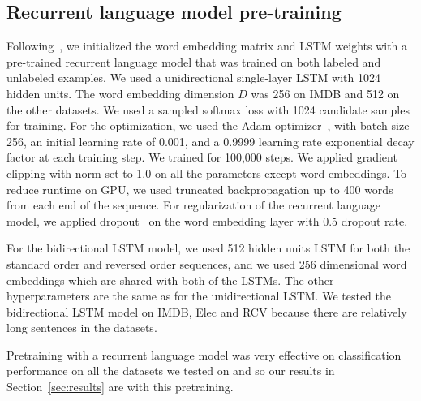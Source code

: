 \documentclass{article}
\begin{document}
\subsection{Recurrent language model pre-training}
Following~\citet{dai2015semi}, we initialized the word embedding 
matrix and LSTM weights with a pre-trained recurrent language model
\cite[]{bengio2006neural, mikolov2010recurrent} that was trained on both labeled and unlabeled
examples.
We used a unidirectional single-layer LSTM with 1024 hidden units.
The word embedding dimension $D$ was 256 on IMDB and 512 on the other datasets. 
We used a sampled softmax loss with 1024 candidate samples for training. 
For the optimization, we used the Adam optimizer~\cite[]{kingma2014adam},
with batch size 256, an initial learning rate of 0.001, and a 0.9999 learning rate
exponential decay factor at each training step.
We trained for 100,000 steps. 
We applied gradient clipping with norm set to 1.0 on all the parameters except word embeddings.
To reduce runtime on GPU, we used truncated backpropagation up to 400 words
 from each end of the sequence. 
For regularization of the recurrent language model, we applied dropout~\cite[]{srivastava2014dropout} 
on the word embedding layer with 0.5 dropout rate.

For the bidirectional LSTM model, we used 512 hidden units LSTM for both the standard
order and reversed order sequences, and we used 256 dimensional word embeddings
which are shared with both of the LSTMs. The other hyperparameters are the same as for the unidirectional LSTM.
We tested the bidirectional LSTM model on IMDB, Elec and RCV because there are relatively long sentences
in the datasets.
 
Pretraining with a recurrent language model was very effective on classification
performance on all the datasets we tested on and so our results in
Section~\ref{sec:results} are with this pretraining.
\end{document}
